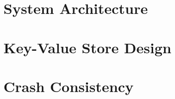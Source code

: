 \section{System Architecture}
\label{ch:concept-system}


\section{Key-Value Store Design}
\label{ch:concept-kvs}


\section{Crash Consistency}
\label{ch:concept-consistency}


